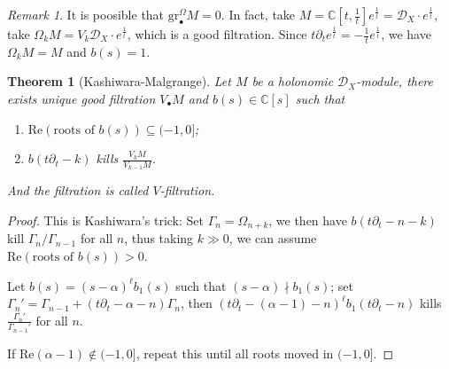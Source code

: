 \documentclass[openany]{book}
\newtheorem{theorem}{Theorem}[chapter] %
\theoremstyle{definition} %
\theoremstyle{remark}
\newtheorem{remark}{Remark}[chapter] %
\begin{document}
\begin{remark}
    It is poosible that $\mathrm{gr}_{\bullet}^\Omega M=0$. In fact, take $M=\mathbb{C}[t, \frac{1}{t}]e^{\frac{1}{t}}=\mathcal{D}_{X}\cdot e^{\frac{1}{t}}$, take $\Omega_{k}M=V_{k}\mathcal{D}_{X}\cdot e^{\frac{1}{t}}$, which is a good filtration. Since $t\partial_{t}e^{\frac{1}{t}}= -\frac{1}{t} e^{\frac{1}{t}}$, we have $\Omega_{k}M=M$ and $b(s)=1$.
\end{remark}

\begin{theorem}[Kashiwara-Malgrange]\label{Theorem 8.7}
    Let $M$ be a holonomic $\mathcal{D}_{X}$-module, there exists unique good filtration $V_{\bullet}M$ and $b(s)\in\mathbb{C}[s]$ such that
    \begin{enumerate}
        \item $\mathrm{Re}(\text{roots of }b(s))\subseteq(-1,0]$;
        \item $b(t\partial_{t}-k)$ kills $\frac{V_{k}M}{V_{k-1}M}$.
    \end{enumerate}
    And the filtration is called $V$-filtration.
\end{theorem}
\begin{proof}
    This is Kashiwara's trick:
    Set $\Gamma_{n}=\Omega_{n+k}$, we then have $b(t\partial_{t}-n-k)$ kill $\Gamma_{n} /\Gamma_{n-1}$ for all $n$, thus taking $k\gg 0$, we can assume $\mathrm{Re}(\text{roots of }b(s))>0$.

    Let $b(s)=(s-\alpha)^\ell b_{1}(s)$ such that $(s-\alpha)\nmid b_{1}(s)$; set $\Gamma_{n}'=\Gamma_{n-1}+(t\partial_{t}-\alpha-n)\Gamma_{n}$, then $(t\partial_{t}-(\alpha-1)-n)^\ell b_{1}(t\partial_{t}-n)$ kills $\frac{\Gamma_{n}'}{\Gamma_{n-1}'}$ for all $n$.

    If $\mathrm{Re}(\alpha-1)\notin(-1,0]$, repeat this until all roots moved in $(-1,0]$.
\end{proof}
\end{document}
